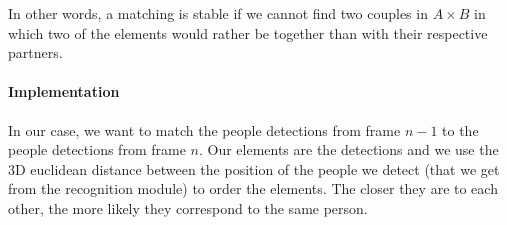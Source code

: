 \documentclass[a4paper, twocolumn]{article}
\begin{document}
    In other words, a matching is stable if we cannot find two couples in $A \times B$ in which two of the elements would rather be together than with their respective partners.

    \paragraph{Implementation} In our case, we want to match the people detections from frame $n-1$ to the people detections from frame $n$. Our elements are the detections and we use the 3D euclidean distance between the position of the people we detect (that we get from the recognition module) to order the elements. The closer they are to each other, the more likely they correspond to the same person.

    \begin{figure}
        \centering
\end{figure}
\end{document}
